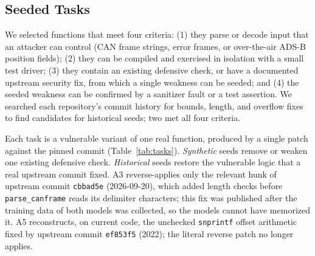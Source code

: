 \documentclass[12pt]{IEEEtran}
\begin{document}
\subsection{Seeded Tasks}
We selected functions that meet four criteria: (1) they parse or decode input that an attacker can control (CAN frame strings, error frames, or over-the-air ADS-B position fields); (2) they can be compiled and exercised in isolation with a small test driver; (3) they contain an existing defensive check, or have a documented upstream security fix, from which a single weakness can be seeded; and (4) the seeded weakness can be confirmed by a sanitizer fault or a test assertion. We searched each repository's commit history for bounds, length, and overflow fixes to find candidates for historical seeds; two met all four criteria.

Each task is a vulnerable variant of one real function, produced by a single patch against the pinned commit (Table~\ref{tab:tasks}). \emph{Synthetic} seeds remove or weaken one existing defensive check. \emph{Historical} seeds restore the vulnerable logic that a real upstream commit fixed. A3 reverse-applies only the relevant hunk of upstream commit \texttt{cbbad5e} (2026-09-20), which added length checks before \texttt{parse\_canframe} reads its delimiter characters; this fix was published after the training data of both models was collected, so the models cannot have memorized it. A5 reconstructs, on current code, the unchecked \texttt{snprintf} offset arithmetic fixed by upstream commit \texttt{ef853f5} (2022); the literal reverse patch no longer applies.
\end{document}
